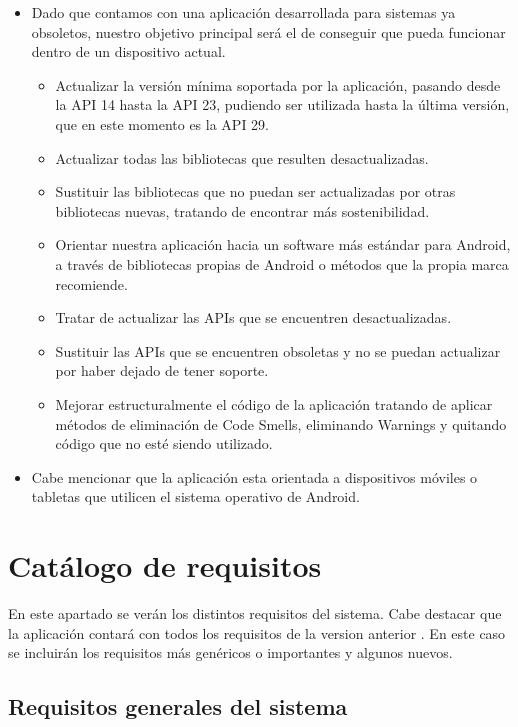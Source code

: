 \begin{itemize}
\item Dado que contamos con una aplicación desarrollada para sistemas ya obsoletos, nuestro objetivo principal será el de conseguir que pueda funcionar dentro de un dispositivo actual.
	\begin{itemize}
	\item Actualizar la versión mínima soportada por la aplicación, pasando desde la API 14 hasta la API 23, pudiendo ser utilizada hasta la última versión, que en este momento es la API 29.
	\item Actualizar todas las bibliotecas que resulten desactualizadas.
	\item Sustituir las bibliotecas que no puedan ser actualizadas por otras bibliotecas nuevas, tratando de encontrar más sostenibilidad.
	\item Orientar nuestra aplicación hacia un software más estándar para Android, a través de bibliotecas propias de Android o métodos que la propia marca recomiende.
	\item Tratar de actualizar las APIs que se encuentren desactualizadas.
	\item Sustituir las APIs que se encuentren obsoletas y no se puedan actualizar por haber dejado de tener soporte.
	\item Mejorar estructuralmente el código de la aplicación tratando de aplicar métodos de eliminación de Code Smells, eliminando Warnings y quitando código que no esté siendo utilizado.
	\end{itemize}
\item Cabe mencionar que la aplicación esta orientada a dispositivos móviles o tabletas que utilicen el sistema operativo de Android.
\end{itemize}

\section{Catálogo de requisitos}

En este apartado se verán los distintos requisitos del sistema. Cabe destacar que la aplicación contará con todos los requisitos de la version anterior \cite{tfm1}. En este caso se incluirán los requisitos más genéricos o importantes y algunos nuevos.

\subsection{Requisitos generales del sistema}

